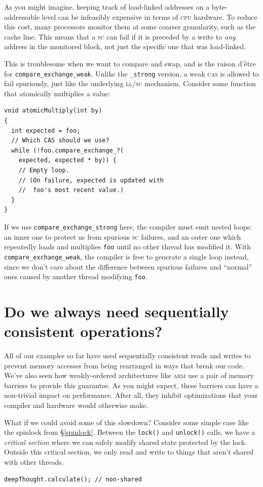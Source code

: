 \documentclass[fontsize=10pt, numbers=endperiod]{scrartcl}
\newcommand{\codesize}{\fontsize{10pt}{12pt}}
\newcommand{\monobox}[1]{\mbox{\texttt{#1}}}
\newcommand{\introduce}[1]{\textit{#1}}
\newcommand{\secref}[1]{\hyperref[#1]{\textsc{\S}\ref*{#1}}}
\newenvironment{colfigure}
  {\par\vspace{1\baselineskip minus 0.5\baselineskip}\noindent\minipage{\linewidth}}
  {\endminipage\vspace*{1\baselineskip minus 0.7\baselineskip}}
\begin{document}
\begin{multicols*}{2}
As you might imagine, keeping track of load-linked addresses on a
byte-addressable level can be infeasibly expensive in terms of \textsc{cpu} hardware.
To reduce this cost, many processors monitor them at some coarser
granularity, such as the cache line.
This means that a \textsc{sc}
can fail if it is preceded by a write to \emph{any} address in the monitored block,
not just the specific one that was load-linked.

This is troublesome when we want to compare and swap,
and is the raison d'être for \monobox{compare\_exchange\_weak}.
Unlike the \monobox{\_strong} version, a weak \textsc{cas}
is allowed to fail spuriously, just like the underlying \textsc{ll/sc} mechanism.
Consider some function that atomically multiplies a value:
\begin{colfigure}
\begin{verbatim}
void atomicMultiply(int by)
{
  int expected = foo;
  // Which CAS should we use?
  while (!foo.compare_exchange_?(
    expected, expected * by)) {
    // Empty loop.
    // (On failure, expected is updated with
    //  foo's most recent value.)
  }
}
\end{verbatim}
\end{colfigure}
If we use \monobox{compare\_exchange\_strong} here,
the compiler must emit nested loops:
an inner one to protect us from spurious \textsc{sc} failures,
and an outer one which repeatedly loads and multiplies \texttt{foo} until no
other thread has modified it.
With \monobox{compare\_exchange\_weak},
the compiler is free to generate a single loop instead,
since we don't care about the difference between spurious failures and ``normal''
ones caused by another thread modifying \texttt{foo}.

\section{Do we always need sequentially consistent operations?}
\label{lock-example}

All of our examples so far have used sequentially consistent reads and writes
to prevent memory accesses from being rearranged in ways that break our code.
We've also seen how weakly-ordered architectures like \textsc{arm}
use a pair of memory barriers to provide this guarantee.
As you might expect, these barriers can have a non-trivial impact on performance.
After all,
they inhibit optimizations that your compiler and hardware would otherwise make.

What if we could avoid some of this slowdown?
Consider some simple case like the spinlock from \secref{spinlock}.
Between the \texttt{lock()} and \texttt{unlock()} calls,
we have a \introduce{critical section}
where we can safely modify shared state protected by the lock.
Outside this critical section,
we only read and write to things that aren't
shared with other threads.
\begin{colfigure}
\begin{verbatim}
deepThought.calculate(); // non-shared


\end{verbatim}
\end{colfigure}
\end{multicols*}
\end{document}
